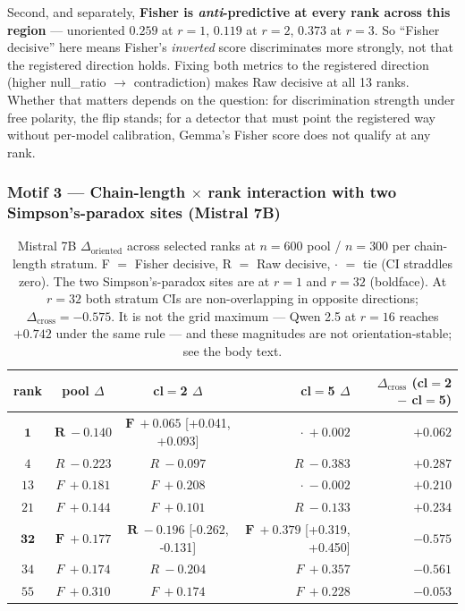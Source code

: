 \documentclass[10pt, letterpaper]{article}
\newcommand{\Doriented}{\Delta_{\text{oriented}}}
\newcommand{\Dcross}{\Delta_{\text{cross}}}
\begin{document}
Second, and separately, \textbf{Fisher is \emph{anti}-predictive at
every rank across this region} --- unoriented $0.259$ at $r=1$, $0.119$
at $r=2$, $0.373$ at $r=3$. So ``Fisher decisive'' here means Fisher's
\emph{inverted} score discriminates more strongly, not that the
registered direction holds. Fixing both metrics to the registered
direction (higher null\_ratio $\to$ contradiction) makes Raw decisive
at all 13 ranks. Whether that matters depends on the question: for
discrimination strength under free polarity, the flip stands; for a
detector that must point the registered way without per-model
calibration, Gemma's Fisher score does not qualify at any rank.

\subsubsection{Motif 3 --- Chain-length $\times$ rank interaction with
two Simpson's-paradox sites (Mistral 7B)}

\begin{table}[htbp]
  \centering
  \small
  \begin{tabular}{cccrr}
  \toprule
  rank & pool $\Delta$ & cl$=$2 $\Delta$ & cl$=$5 $\Delta$ &
    $\Dcross$ (cl$=$2 $-$ cl$=$5) \\
  \midrule
  $\boldsymbol{1}$  & $\boldsymbol{R\ -0.140}$
    & $\boldsymbol{F\ +0.065}$ [+0.041, +0.093] & $\cdot\ +0.002$
    & $+0.062$ \\
  $4$  & $R\ -0.223$ & $R\ -0.097$ & $R\ -0.383$ & $+0.287$ \\
  $13$ & $F\ +0.181$ & $F\ +0.208$ & $\cdot\ -0.002$ & $+0.210$ \\
  $21$ & $F\ +0.144$ & $F\ +0.101$ & $R\ -0.133$ & $+0.234$ \\
  $\boldsymbol{32}$ & $\boldsymbol{F\ +0.177}$
    & $\boldsymbol{R\ -0.196}$ [-0.262, -0.131]
    & $\boldsymbol{F\ +0.379}$ [+0.319, +0.450]
    & $\boldsymbol{-0.575}$ \\
  $34$ & $F\ +0.174$ & $R\ -0.204$ & $F\ +0.357$ & $-0.561$ \\
  $55$ & $F\ +0.310$ & $F\ +0.174$ & $F\ +0.228$ & $-0.053$ \\
  \bottomrule
  \end{tabular}
  \caption{Mistral 7B $\Doriented$ across selected ranks at $n=600$
  pool / $n=300$ per chain-length stratum. F $=$ Fisher decisive,
  R $=$ Raw decisive, $\cdot$ $=$ tie (CI straddles zero). The two
  Simpson's-paradox sites are at $r=1$ and $r=32$ (boldface). At
  $r=32$ both stratum CIs are non-overlapping in opposite directions;
  $\Dcross = -0.575$. It is not the grid maximum --- Qwen 2.5 at
  $r=16$ reaches $+0.742$ under the same rule --- and these magnitudes
  are not orientation-stable; see the body text.}
  \label{tab:mistral}
\end{table}
\end{document}
